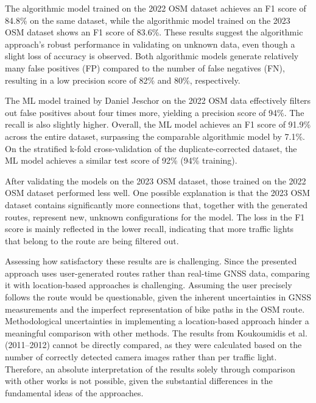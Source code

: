 The algorithmic model trained on the 2022 OSM dataset achieves an F1 score of 84.8\% on the same dataset, while the algorithmic model trained on the 2023 OSM dataset shows an F1 score of 83.6\%. These results suggest the algorithmic approach's robust performance in validating on unknown data, even though a slight loss of accuracy is observed. Both algorithmic models generate relatively many false positives (FP) compared to the number of false negatives (FN), resulting in a low precision score of 82\% and 80\%, respectively.

The ML model trained by Daniel Jeschor \cite{jeschor_2022} on the 2022 OSM data effectively filters out false positives about four times more, yielding a precision score of 94\%. The recall is also slightly higher. Overall, the ML model achieves an F1 score of 91.9\% across the entire dataset, surpassing the comparable algorithmic model by 7.1\%. On the stratified k-fold cross-validation of the duplicate-corrected dataset, the ML model achieves a similar test score of 92\% (94\% training).

After validating the models on the 2023 OSM dataset, those trained on the 2022 OSM dataset performed less well. One possible explanation is that the 2023 OSM dataset contains significantly more connections that, together with the generated routes, represent new, unknown configurations for the model. The loss in the F1 score is mainly reflected in the lower recall, indicating that more traffic lights that belong to the route are being filtered out.

Assessing how satisfactory these results are is challenging. Since the presented approach uses user-generated routes rather than real-time GNSS data, comparing it with location-based approaches is challenging. Assuming the user precisely follows the route would be questionable, given the inherent uncertainties in GNSS measurements and the imperfect representation of bike paths in the OSM route. Methodological uncertainties in implementing a location-based approach hinder a meaningful comparison with other methods. The results from Koukoumidis et al. (2011–2012) \cite{koukoumidis_signalguru_2011, koukoumidis_leveraging_2012} cannot be directly compared, as they were calculated based on the number of correctly detected camera images rather than per traffic light. Therefore, an absolute interpretation of the results solely through comparison with other works is not possible, given the substantial differences in the fundamental ideas of the approaches.

